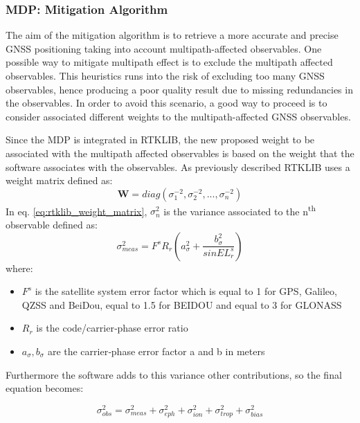 \subsubsection{MDP: Mitigation Algorithm}
The aim of the mitigation algorithm is to retrieve a more accurate and precise GNSS positioning taking into account multipath-affected observables. One possible way to mitigate multipath effect is to exclude the multipath affected observables. This heuristics runs into the risk of excluding too many GNSS observables, hence producing a poor quality result due to missing redundancies in the 
observables. In order to avoid this scenario, a good way to proceed is to consider associated different weights to the multipath-affected GNSS observables. 

Since the MDP is integrated in RTKLIB, the new proposed weight to be associated with the multipath affected observables is based on the weight that the software associates with the observables.
As previously described RTKLIB uses a weight matrix defined as:
\begin{equation}
\textbf{W}=diag\left(\sigma_{1}^{-2}, \sigma_{2}^{-2}, ...,\sigma_{n}^{-2}\right)
\label{eq:rtklib_weight_matrix}
\end{equation}
In eq. \ref{eq:rtklib_weight_matrix}, $\sigma_{n}^{2}$ is the variance associated to the n\textsuperscript{th} observable defined as:
\begin{equation}
\sigma_{meas}^{2}=F^{s}R_{r}\left(a_{\sigma}^{2}+\frac{b_{\sigma}^{2}}{sinEL_{r}^{s}}\right)
\label{eq:rtklib_weight_matrix1}
\end{equation}
where:
\begin{itemize}
    \item $F^{s}$ is the satellite system error factor which is equal to 1 for GPS, Galileo, QZSS and BeiDou, equal to 1.5 for BEIDOU and equal to 3 for GLONASS
    \item $R_{r}$ is the code/carrier‐phase error ratio
    \item $a_{\sigma}, b_{\sigma}$ are the carrier‐phase error factor a and b in meters
\end{itemize}
    
Furthermore the software adds to this variance other contributions, so the final equation becomes:

\begin{equation}
\sigma_{obs}^2= \sigma_{meas}^2+\sigma_{eph}^{2}+\sigma_{ion}^{2}+\sigma_{trop}^{2}+\sigma_{bias}^{2}
\label{eq:rtklib_variance_matrix1}
\end{equation}


